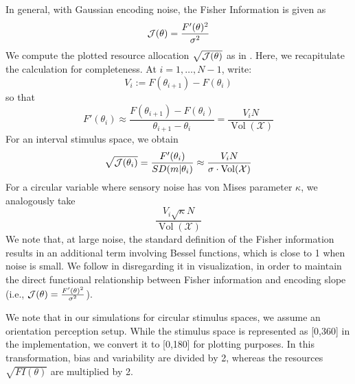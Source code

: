 In general, with Gaussian encoding noise, the Fisher Information is given as
\begin{equation}
    \mathcal{J}(\theta) = \frac{F'(\theta)^2}{\sigma^2}
\end{equation}
We compute the plotted resource allocation $\sqrt{\mathcal{J}(\theta)}$ as in \cite{hahn2024unifying}. Here, we recapitulate the calculation for completeness.
At $i=1, \dots, N-1$, write:
\begin{equation}
    V_i := F(\theta_{i+1}) - F(\theta_{i})
\end{equation}
so that
\begin{equation}
    F'(\theta_i) \approx \frac{F(\theta_{i+1}) - F(\theta_i)}{\theta_{i+1}-\theta_i} = \frac{V_i N}{\operatorname{Vol}(\mathcal{X})}
\end{equation}
For an interval stimulus space, we obtain
\begin{equation}
    \sqrt{\mathcal{J}(\theta_i)} = \frac{F'(\theta_i)}{SD(m|\theta_i)} \approx \frac{V_i N}{\sigma \cdot \operatorname{Vol}(\mathcal{X})}
\end{equation}
For a circular variable where sensory noise has von Mises parameter $\kappa$, we analogously take
\begin{equation}
    \frac{V_i \sqrt{\kappa} N}{\operatorname{Vol}(\mathcal{X})}
\end{equation}
We note that, at large noise, the standard definition of the Fisher information results in an additional term involving Bessel functions, which is close to 1 when noise is small. We follow \cite{hahn2024unifying} in disregarding it in visualization, in order to maintain the direct functional relationship between Fisher information and encoding slope (i.e., $\mathcal{J}(\theta) = \frac{F'(\theta)^2}{\sigma^2}$).

We note that in our simulations for circular stimulus spaces, we assume an orientation perception setup. While the stimulus space is represented as [0,360] in the implementation, we convert it to [0,180] for plotting purposes. In this transformation, bias and variability are divided by 2, whereas the resources $\sqrt{FI(\theta)}$ are multiplied by 2.

